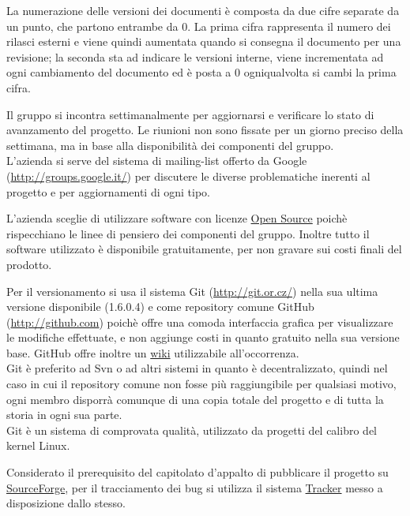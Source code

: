   La numerazione delle versioni dei documenti \`e composta da due cifre separate da un punto, che partono entrambe da 0. La prima cifra rappresenta il numero dei rilasci esterni e viene quindi aumentata quando si consegna il documento per una revisione; la seconda sta ad indicare le versioni interne, viene incrementata ad ogni cambiamento del documento ed \`e posta a 0 ogniqualvolta si cambi la prima cifra.
 
Il gruppo si incontra settimanalmente per aggiornarsi e verificare lo stato di avanzamento del progetto. Le riunioni non sono fissate per un giorno preciso della settimana, ma in base alla disponibilit\`a dei componenti del gruppo.\\
L'azienda si serve del sistema di mailing-list offerto da Google (\href{http://groups.google.it/}{http://groups.google.it/}) per discutere le diverse problematiche inerenti al progetto e per aggiornamenti di ogni tipo.
 
L'azienda sceglie di utilizzare software con licenze \underline{Open Source} poich\`e rispecchiano le linee di pensiero dei componenti del gruppo. Inoltre tutto il software utilizzato \`e disponibile gratuitamente, per non gravare sui costi finali del prodotto.
 
Per il versionamento si usa il sistema Git (\href{http://git.or.cz/}{http://git.or.cz/}) nella sua ultima versione disponibile (1.6.0.4) e come repository comune GitHub (\href{http://github.com}{http://github.com}) poich\`e offre una comoda interfaccia grafica per visualizzare le modifiche effettuate, e non aggiunge costi in quanto gratuito nella sua versione base. GitHub offre inoltre un \underline{wiki} utilizzabile all'occorrenza.\\
Git \`e preferito ad Svn o ad altri sistemi in quanto \`e decentralizzato, quindi nel caso in cui il repository comune non fosse pi\`u raggiungibile per qualsiasi motivo, ogni membro disporr\`a comunque di una copia totale del progetto e di tutta la storia in ogni sua parte.\\
Git \`e un sistema di comprovata qualit\`a, utilizzato da progetti del calibro del kernel Linux.
 
Considerato il prerequisito del capitolato d'appalto di pubblicare il progetto su \href{http://sourceforge.net}{SourceForge}, per il tracciamento dei bug si utilizza il sistema \href{https://sourceforge.net/tracker/?group_id=245619}{Tracker} messo a disposizione dallo stesso.
 
